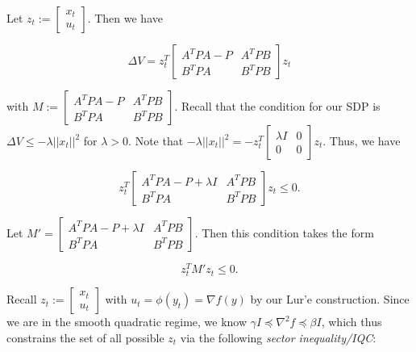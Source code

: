 \documentclass[twoside,11pt]{article}
\begin{document}
\noindent
Let $z_t := \begin{bmatrix}
    x_t \\
    u_t
\end{bmatrix}$. Then we have

\begin{equation}
\Delta V = z_t^T\begin{bmatrix}
    A^TPA-P & A^TPB \\
    B^TPA & B^TPB
\end{bmatrix}z_t
\end{equation}

\noindent
with $M := \begin{bmatrix}
    A^TPA-P & A^TPB \\
    B^TPA & B^TPB
\end{bmatrix}$. Recall that the condition for our SDP is $\Delta V \leq -\lambda ||x_t||^2$ for $\lambda > 0$. Note that $-\lambda ||x_t||^2 = -z_t^T \begin{bmatrix}
    \lambda I & 0 \\
    0 & 0
\end{bmatrix}z_t$. Thus, we have

\begin{equation}
z_t^T\begin{bmatrix}
    A^TPA-P+\lambda I & A^TPB \\
    B^TPA & B^TPB
\end{bmatrix}z_t \leq 0. 
\end{equation}

\noindent
Let $M' = \begin{bmatrix}
    A^TPA-P+\lambda I & A^TPB \\
    B^TPA & B^TPB
\end{bmatrix}$. Then this condition takes the form

\begin{equation}
z_t^T M' z_t \leq 0.
\end{equation}

\noindent
Recall $z_t := \begin{bmatrix}
    x_t \\
    u_t
\end{bmatrix}$ with $u_t = \phi(y_t) = \nabla f(y)$ by our Lur'e construction. Since we are in the smooth quadratic regime, we know $\gamma I \preceq \nabla^2f \preceq \beta I$, which thus constrains the set of all possible $z_t$ via the following \textit{sector inequality/IQC}:
\end{document}
